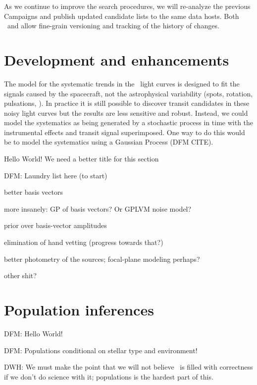 \documentclass[12pt,preprint]{aastex}
\newcommand{\github}{\project{GitHub}}
\begin{document}
As we continue to improve the search procedures, we will re-analyze the
previous Campaigns and publish updated candidate lists to the same data hosts.
Both \github\ and  allow fine-grain versioning and tracking
of the history of changes.


\section{Development and enhancements}

\begin{itemize}

{\item The \citet{Foreman-Mackey:2015} model for the systematic trends in the
\kt\ light curves is designed to fit the signals caused by the spacecraft, not
the astrophysical variability (spots, rotation, pulsations, \etc).
In practice it is still possible to discover transit candidates in these noisy
light curves but the results are less sensitive and robust.
Instead, we could model the systematics as being generated by a stochastic
process in time with the instrumental effects and transit signal
superimposed.
One way to do this would be to model the systematics using a Gaussian Process
(DFM CITE).}



\end{itemize}

Hello World!  We need a better title for this section

DFM:  Laundry list here (to start)

better basis vectors

more insanely: GP of basis vectors?  Or GPLVM noise model?

prior over basis-vector amplitudes

elimination of hand vetting (progress towards that?)

better photometry of the sources; focal-plane modeling perhaps?

other shit?

\section{Population inferences}

DFM:  Hello World!

DFM:  Populations conditional on stellar type and environment!

DWH:  We must make the point that we will not believe \thecatalog\ is filled
with correctness if we don't do science with it; populations is the hardest
part of this.
\end{document}
